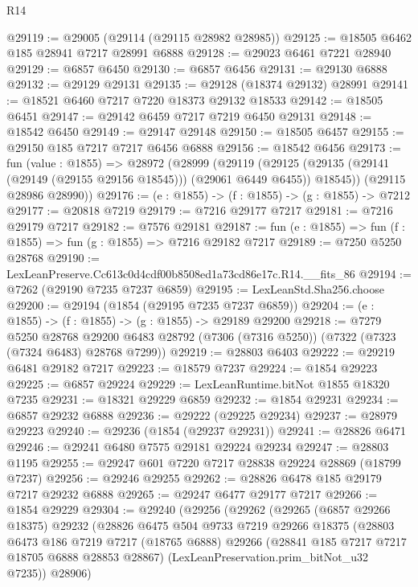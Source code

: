 \begin{lexlean}{R14}
\begin{coremodule}
@29119 := @29005 (@29114 (@29115 @28982 @28985))
@29125 := @18505 @6462 @185 @28941 @7217 @28991 @6888
@29128 := @29023 @6461 @7221 @28940
@29129 := @6857 @6450
@29130 := @6857 @6456
@29131 := @29130 @6888
@29132 := @29129 @29131
@29135 := @29128 (@18374 @29132) @28991
@29141 := @18521 @6460 @7217 @7220 @18373 @29132 @18533
@29142 := @18505 @6451
@29147 := @29142 @6459 @7217 @7219 @6450 @29131
@29148 := @18542 @6450
@29149 := @29147 @29148
@29150 := @18505 @6457
@29155 := @29150 @185 @7217 @7217 @6456 @6888
@29156 := @18542 @6456
@29173 := fun (value : @1855) =>
  @28972
    (@28999
      (@29119
        (@29125 (@29135 (@29141 (@29149 (@29155 @29156 @18545))) (@29061 @6449 @6455)) @18545))
      (@29115 @28986 @28990))
@29176 := (e : @1855) -> (f : @1855) -> (g : @1855) -> @7212
@29177 := @20818 @7219
@29179 := @7216 @29177 @7217
@29181 := @7216 @29179 @7217
@29182 := @7576 @29181
@29187 := fun (e : @1855) => fun (f : @1855) => fun (g : @1855) => @7216 @29182 @7217
@29189 := @7250 @5250 @28768
@29190 := LexLeanPreserve.Cc613c0d4cdf00b8508ed1a73cd86e17c.R14.__fits_86
@29194 := @7262 (@29190 @7235 @7237 @6859)
@29195 := LexLeanStd.Sha256.choose
@29200 := @29194 (@1854 (@29195 @7235 @7237 @6859))
@29204 := (e : @1855) -> (f : @1855) -> (g : @1855) -> @29189 @29200
@29218 := @7279
    @5250
    @28768
    @29200
    @6483
    @28792
    (@7306 (@7316 @5250))
    (@7322 (@7323 (@7324 @6483) @28768 @7299))
@29219 := @28803 @6403
@29222 := @29219 @6481 @29182 @7217
@29223 := @18579 @7237
@29224 := @1854 @29223
@29225 := @6857 @29224
@29229 := LexLeanRuntime.bitNot @1855 @18320 @7235
@29231 := @18321 @29229 @6859
@29232 := @1854 @29231
@29234 := @6857 @29232 @6888
@29236 := @29222 (@29225 @29234)
@29237 := @28979 @29223
@29240 := @29236 (@1854 (@29237 @29231))
@29241 := @28826 @6471
@29246 := @29241 @6480 @7575 @29181 @29224 @29234
@29247 := @28803 @1195
@29255 := @29247 @601 @7220 @7217 @28838 @29224 @28869 (@18799 @7237)
@29256 := @29246 @29255
@29262 := @28826 @6478 @185 @29179 @7217 @29232 @6888
@29265 := @29247 @6477 @29177 @7217
@29266 := @1854 @29229
@29304 := @29240
    (@29256
      (@29262
        (@29265
          (@6857 @29266 @18375)
          @29232
          (@28826
            @6475
            @504
            @9733
            @7219
            @29266
            @18375
            (@28803
              @6473
              @186
              @7219
              @7217
              (@18765 @6888)
              @29266
              (@28841 @185 @7217 @7217 @18705 @6888 @28853 @28867)
              (LexLeanPreservation.prim_bitNot_u32 @7235))
            @28906)

\end{coremodule}
\end{lexlean}
